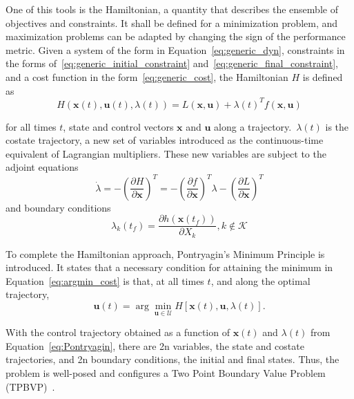 One of this tools is the Hamiltonian, a quantity that describes the ensemble of objectives and constraints. It shall be defined for a minimization problem, and maximization problems can be adapted by changing the sign of the performance metric. Given a system of the form in Equation~\eqref{eq:generic_dyn}, constraints in the forms of~\eqref{eq:generic_initial_constraint} and~\eqref{eq:generic_final_constraint}, and a cost function in the form~\eqref{eq:generic_cost}, the Hamiltonian \(H\) is defined as~\cite{bertsekas}
\begin{equation}
    H(\mathbf{x}(t), \mathbf{u}(t), \lambda(t)) = L(\mathbf{x}, \mathbf{u}) + \lambda{(t)}^T f(\mathbf{x}, \mathbf{u})
\end{equation}

for all times \(t\), state and control vectors \(\mathbf{x}  \) and \(\mathbf{u}\) along a trajectory.\ \( \lambda(t) \) is the costate trajectory, a new set of variables introduced as the continuous-time equivalent of Lagrangian multipliers. These new variables are subject to the adjoint equations
\begin{equation}
    \dot{\lambda} = - \left( \frac{\partial H}{\partial \mathbf{x}} \right)^T = -\left( \frac{\partial f}{\partial \mathbf{x}} \right)^T \lambda - \left( \frac{\partial L}{\partial \mathbf{x}} \right)^T
\end{equation}
and boundary conditions~\cite{bryson_applied_optimal_control}
\begin{equation}
    \lambda_k(t_f) = \frac{\partial h(\mathbf{x}(t_f))}{\partial X_k}, k \notin \mathcal{K}
\end{equation}

To complete the Hamiltonian approach, Pontryagin's Minimum Principle is introduced. It states that a necessary condition for attaining the minimum in Equation~\eqref{eq:argmin_cost} is that, at all times \(t\), and along the optimal trajectory,
\begin{equation} \label{eq:Pontryagin}
    \mathbf{u}(t) = \arg \min_{\mathbf{u} \in \mathcal{U}} H[\mathbf{x}(t), \mathbf{u}, \lambda(t)].
\end{equation}

With the control trajectory obtained as a function of \(\mathbf{x}(t)\) and \(\lambda(t)\) from Equation~\eqref{eq:Pontryagin}, there are 2n variables, the state and costate trajectories, and 2n boundary conditions, the initial and final states. Thus, the problem is well-posed and configures a Two Point Boundary Value Problem (TPBVP)~\cite{bryson_applied_optimal_control}.

